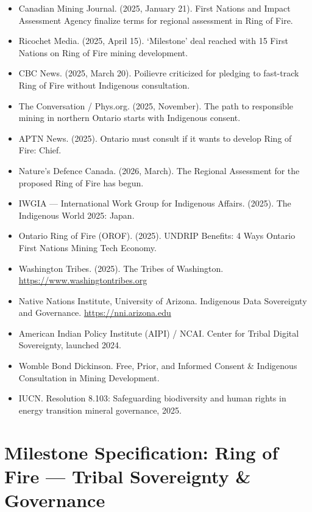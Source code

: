 \documentclass[11pt,letterpaper]{article}
\newcommand{\stageheader}[2]{%
  \noindent\colorbox{#2}{\makebox[\textwidth][l]{%
    \textcolor{white}{\bfseries\sffamily\hspace{6pt}#1\hspace{6pt}}}}%
  \vspace{0.5em}\par%
}
\begin{document}
\begin{itemize}
  \item Canadian Mining Journal. (2025, January 21). First Nations and Impact Assessment Agency finalize terms for regional assessment in Ring of Fire.
  \item Ricochet Media. (2025, April 15). `Milestone' deal reached with 15 First Nations on Ring of Fire mining development.
  \item CBC News. (2025, March 20). Poilievre criticized for pledging to fast-track Ring of Fire without Indigenous consultation.
  \item The Conversation / Phys.org. (2025, November). The path to responsible mining in northern Ontario starts with Indigenous consent.
  \item APTN News. (2025). Ontario must consult if it wants to develop Ring of Fire: Chief.
  \item Nature's Defence Canada. (2026, March). The Regional Assessment for the proposed Ring of Fire has begun.
  \item IWGIA --- International Work Group for Indigenous Affairs. (2025). The Indigenous World 2025: Japan.
  \item Ontario Ring of Fire (OROF). (2025). UNDRIP Benefits: 4 Ways Ontario First Nations Mining Tech Economy.
  \item Washington Tribes. (2025). The Tribes of Washington. \url{https://www.washingtontribes.org}
  \item Native Nations Institute, University of Arizona. Indigenous Data Sovereignty and Governance. \url{https://nni.arizona.edu}
  \item American Indian Policy Institute (AIPI) / NCAI. Center for Tribal Digital Sovereignty, launched 2024.
  \item Womble Bond Dickinson. Free, Prior, and Informed Consent \& Indigenous Consultation in Mining Development.
  \item IUCN. Resolution 8.103: Safeguarding biodiversity and human rights in energy transition mineral governance, 2025.
\end{itemize}

\newpage

\stageheader{STAGE 3 --- MISSION PACKAGE}{tertiary}

\section{Milestone Specification: Ring of Fire --- Tribal Sovereignty \& Governance}
\end{document}
